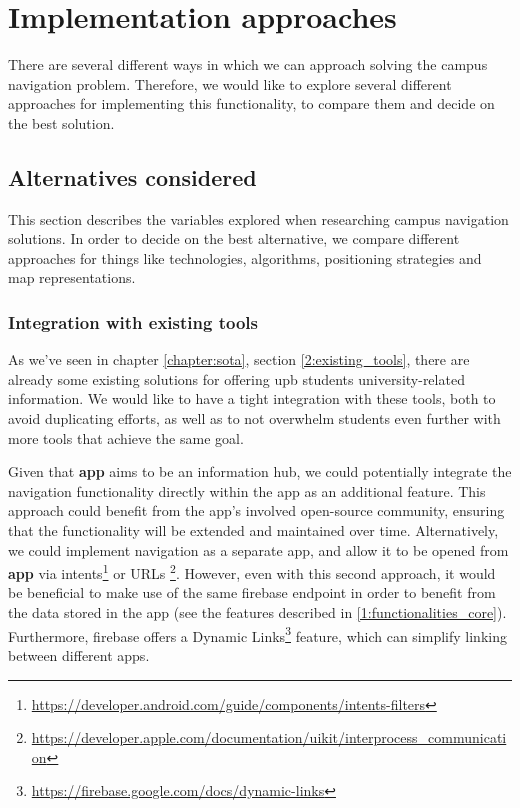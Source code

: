 \chapter{Implementation approaches} \label{chapter:implementations}

There are several different ways in which we can approach solving the campus navigation problem. Therefore, we would like to explore several different approaches for implementing this functionality, to compare them and decide on the best solution.

\section{Alternatives considered} \label{3:alternatives_considered}

    This section describes the variables explored when researching campus navigation solutions. In order to decide on the best alternative, we compare different approaches for things like technologies, algorithms, positioning strategies and map representations.

    \subsection{Integration with existing tools}
        
        As we've seen in chapter \ref{chapter:sota}, section \ref{2:existing_tools}, there are already some existing solutions for offering \acrshort{upb} students university-related information. We would like to have a tight integration with these tools, both to avoid duplicating efforts, as well as to not overwhelm students even further with more tools that achieve the same goal.
        
        Given that \textbf{\gls{app}} aims to be an information hub, we could potentially integrate the navigation functionality directly within the app as an additional feature. This approach could benefit from the app's involved open-source community, ensuring that the functionality will be extended and maintained over time. Alternatively, we could implement navigation as a separate app, and allow it to be opened from \textbf{\gls{app}} via intents\footnote{\url{https://developer.android.com/guide/components/intents-filters}} or URLs \footnote{\url{https://developer.apple.com/documentation/uikit/interprocess_communication}}. However, even with this second approach, it would be beneficial to make use of the same \gls{firebase} endpoint in order to benefit from the data stored in the app (see the features described in \ref{1:functionalities_core}). Furthermore, \gls{firebase} offers a Dynamic Links\footnote{\url{https://firebase.google.com/docs/dynamic-links}} feature, which can simplify linking between different apps.
        
